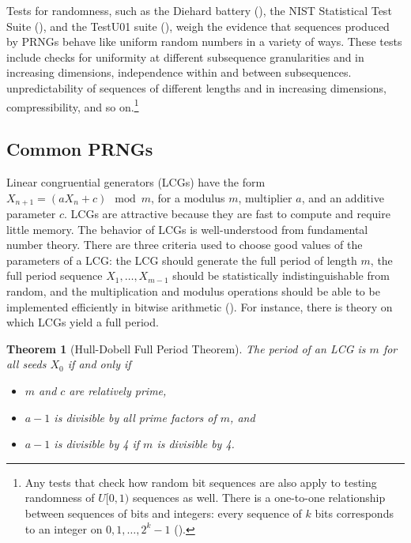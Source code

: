 \documentclass[12pt]{article}
\newtheorem{theorem}{Theorem}[section]
\newcommand{\todo}[1]{{\color{red}{TO DO: \sc #1}}}
\begin{document}
Tests for randomness, such as the Diehard battery (\cite{marsaglia_diehard_1995}), the NIST Statistical Test Suite (\cite{soto_statistical_1999,rukhin_statistical_2010}), and the TestU01 suite (\cite{lecuyer_testu01_2007}),
weigh the evidence that sequences produced by PRNGs behave like uniform random numbers in a variety of ways.
These tests include checks for uniformity at different subsequence granularities and in increasing dimensions,
independence within and between subsequences.
unpredictability of sequences of different lengths and in increasing dimensions,
compressibility, and so on.\footnote{
Any tests that check how random bit sequences are also apply to testing randomness of $U[0,1)$ sequences as well.
There is a one-to-one relationship between sequences of bits and integers:
every sequence of $k$ bits corresponds to an integer on $0, 1, \dots, 2^k-1$ (\cite{lecuyer_testu01_2007}).
}


\subsection{Common PRNGs}

Linear congruential generators (LCGs) have the form $X_{n+1} = (a X_n + c) \mod m$, for a modulus $m$, 
multiplier $a$, and an additive parameter $c$.
LCGs are attractive because they are fast to compute and require little memory.
The behavior of LCGs is well-understood from fundamental number theory.
There are three criteria used to choose good values of the parameters of a LCG:
the LCG should generate the full period of length $m$,
the full period sequence $X_1, \dots, X_{m-1}$ should be statistically indistinguishable from random,
and the multiplication and modulus operations should be able to be implemented efficiently in bitwise arithmetic (\cite{hornfeck_multiplicative_2009}).
For instance, there is theory on which LCGs yield a full period. \todo{cite theorem}

\begin{theorem}[Hull-Dobell Full Period Theorem]
\label{thm:hull_dobell_period}
The period of an LCG is $m$ for all seeds $X_0$ if and only if
\begin{itemize}
\item $m$ and $c$ are relatively prime,
\item $a-1$ is divisible by all prime factors of $m$, and
\item $a-1$ is divisible by 4 if $m$ is divisible by 4.
\end{itemize}
\end{theorem}
\end{document}
